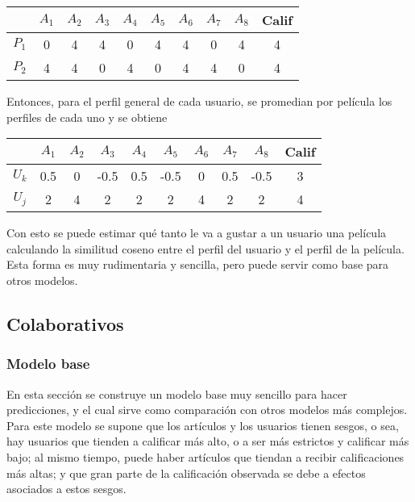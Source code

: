 \begin{center}
\begin{tabular}{ c | c  c c c c c c c c}
    & $A_1$ & $A_2$ & $A_3$ & $A_4$ & $A_5$ & $A_6$ & $A_7$ & $A_8$ & Calif \\
  \hline                       
$P_1$ & 0 & 4 & 4 & 0 & 4 & 4 & 0 & 4 & 4 \\
$P_2$ & 4 & 4 & 0 & 4 & 0 & 4 & 4 & 0 & 4 \\
  \hline  
\end{tabular}
\end{center}

Entonces, para el perfil general de cada usuario, se promedian por película los perfiles de cada uno y se obtiene

\begin{center}
\begin{tabular}{ c | c  c c c c c c c c}
    & $A_1$ & $A_2$ & $A_3$ & $A_4$ & $A_5$ & $A_6$ & $A_7$ & $A_8$ & Calif \\
  \hline                       
$U_k$ & 0.5 & 0 & -0.5 & 0.5 & -0.5 & 0 & 0.5 & -0.5 & 3 \\
$U_j$ & 2 & 4 & 2 & 2 & 2 & 4 & 2 & 2 & 4 \\
  \hline  
\end{tabular}
\end{center}

Con esto se puede estimar qué tanto le va a gustar a un usuario una película calculando la similitud coseno entre el perfil del usuario y el perfil de la película. Esta forma es muy rudimentaria y sencilla, pero puede servir como base para otros modelos.

\subsection{Colaborativos}

\subsubsection{Modelo base} \label{sec:modelo_base}

En esta sección se construye un modelo base muy sencillo para hacer predicciones, y el cual sirve como comparación con otros modelos más complejos. Para este modelo se supone que los artículos y los usuarios tienen sesgos, o sea, hay usuarios que tienden a calificar más alto, o a ser más estrictos y calificar más bajo; al mismo tiempo, puede haber artículos que tiendan a recibir calificaciones más altas; y que gran parte de la calificación observada se debe a efectos asociados a estos sesgos.

